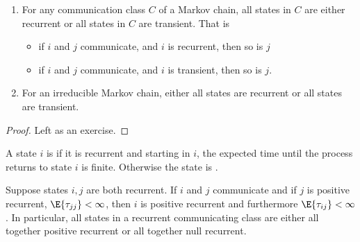 \documentclass[12pt]{article}
\begin{document}
\begin{corollary}
    \label{cor:stationarydistributions:allrecurrent}
    \begin{enumerate}
        \item
            For any communication class \( C \) of a Markov chain, all
            states in \( C \) are either recurrent or all states in \( C
            \) are transient.  That is
            \begin{itemize}
                \item
                    if \( i \) and \( j \) communicate, and \( i \) is
                    recurrent, then so is \( j \)
                \item
                    if \( i \) and \( j \) communicate, and \( i \) is
                    transient, then so is \( j \).
            \end{itemize}
        \item
            For an irreducible Markov chain, either all states are
            recurrent or all states are transient.
    \end{enumerate}
\end{corollary}

\begin{proof}
    Left as an exercise.
\end{proof}

\begin{definition}
    A state \( i \) is  if it is recurrent and
    starting in \( i \), the expected time until the process returns to
    state \( i \) is finite.  Otherwise the state is .
\end{definition}

\begin{proposition}
    Suppose states \( i,j \) are both recurrent.  If \( i \) and \( j \)
    communicate and if \( j \) is positive recurrent, \( \E{\tau_{jj}} <
    \infty \), then \( i \) is positive recurrent and furthermore \( \E{\tau_
    {ij}} < \infty \).  In particular, all states in a recurrent
    communicating class are either all together positive recurrent or
    all together null recurrent.
\end{proposition}
\end{document}
